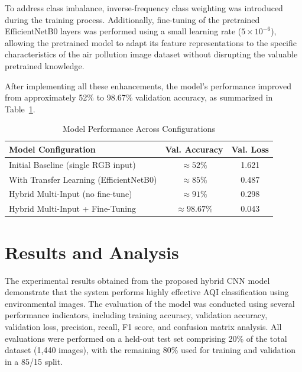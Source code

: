 \documentclass[conference]{IEEEtran}
\begin{document}
To address class imbalance, inverse-frequency class weighting was introduced
during the training process. Additionally, fine-tuning of the pretrained
EfficientNetB0 layers was performed using a small learning rate ($5 \times
10^{-6}$), allowing the pretrained model to adapt its feature representations
to the specific characteristics of the air pollution image dataset without
disrupting the valuable pretrained knowledge.

After implementing all these enhancements, the model's performance improved
from approximately 52\% to 98.67\% validation accuracy, as summarized in
Table~\ref{tab:performance}.

\begin{table}[h]
  \centering
  \caption{Model Performance Across Configurations}
  \label{tab:performance}
  \renewcommand{\arraystretch}{1.3}
  \begin{tabular}{lcc}
    \toprule
    \textbf{Model Configuration} & \textbf{Val. Accuracy} & \textbf{Val. Loss} \\
    \midrule
    Initial Baseline (single RGB input) & $\approx 52\%$ & 1.621 \\
    With Transfer Learning (EfficientNetB0) & $\approx 85\%$ & 0.487 \\
    Hybrid Multi-Input (no fine-tune) & $\approx 91\%$ & 0.298 \\
    Hybrid Multi-Input + Fine-Tuning & $\approx 98.67\%$ & 0.043 \\
    \bottomrule
  \end{tabular}
\end{table}

\section{Results and Analysis}

The experimental results obtained from the proposed hybrid CNN model
demonstrate that the system performs highly effective AQI classification
using environmental images. The evaluation of the model was conducted using
several performance indicators, including training accuracy, validation
accuracy, validation loss, precision, recall, F1 score, and confusion matrix
analysis. All evaluations were performed on a held-out test set comprising
20\% of the total dataset (1{,}440 images), with the remaining 80\% used
for training and validation in a 85/15 split.
\end{document}
